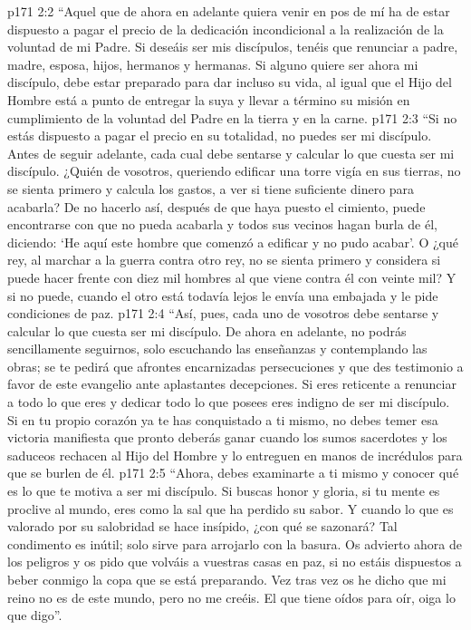 \vs p171 2:2 \pc “Aquel que de ahora en adelante quiera venir en pos de mí ha de estar dispuesto a pagar el precio de la dedicación incondicional a la realización de la voluntad de mi Padre. Si deseáis ser mis discípulos, tenéis que renunciar a padre, madre, esposa, hijos, hermanos y hermanas. Si alguno quiere ser ahora mi discípulo, debe estar preparado para dar incluso su vida, al igual que el Hijo del Hombre está a punto de entregar la suya y llevar a término su misión en cumplimiento de la voluntad del Padre en la tierra y en la carne.
\vs p171 2:3 “Si no estás dispuesto a pagar el precio en su totalidad, no puedes ser mi discípulo. Antes de seguir adelante, cada cual debe sentarse y calcular lo que cuesta ser mi discípulo. ¿Quién de vosotros, queriendo edificar una torre vigía en sus tierras, no se sienta primero y calcula los gastos, a ver si tiene suficiente dinero para acabarla? De no hacerlo así, después de que haya puesto el cimiento, puede encontrarse con que no pueda acabarla y todos sus vecinos hagan burla de él, diciendo: ‘He aquí este hombre que comenzó a edificar y no pudo acabar’. O ¿qué rey, al marchar a la guerra contra otro rey, no se sienta primero y considera si puede hacer frente con diez mil hombres al que viene contra él con veinte mil? Y si no puede, cuando el otro está todavía lejos le envía una embajada y le pide condiciones de paz.
\vs p171 2:4 “Así, pues, cada uno de vosotros debe sentarse y calcular lo que cuesta ser mi discípulo. De ahora en adelante, no podrás sencillamente seguirnos, solo escuchando las enseñanzas y contemplando las obras; se te pedirá que afrontes encarnizadas persecuciones y que des testimonio a favor de este evangelio ante aplastantes decepciones. Si eres reticente a renunciar a todo lo que eres y dedicar todo lo que posees eres indigno de ser mi discípulo. Si en tu propio corazón ya te has conquistado a ti mismo, no debes temer esa victoria manifiesta que pronto deberás ganar cuando los sumos sacerdotes y los saduceos rechacen al Hijo del Hombre y lo entreguen en manos de incrédulos para que se burlen de él.
\vs p171 2:5 “Ahora, debes examinarte a ti mismo y conocer qué es lo que te motiva a ser mi discípulo. Si buscas honor y gloria, si tu mente es proclive al mundo, eres como la sal que ha perdido su sabor. Y cuando lo que es valorado por su salobridad se hace insípido, ¿con qué se sazonará? Tal condimento es inútil; solo sirve para arrojarlo con la basura. Os advierto ahora de los peligros y os pido que volváis a vuestras casas en paz, si no estáis dispuestos a beber conmigo la copa que se está preparando. Vez tras vez os he dicho que mi reino no es de este mundo, pero no me creéis. El que tiene oídos para oír, oiga lo que digo”.
